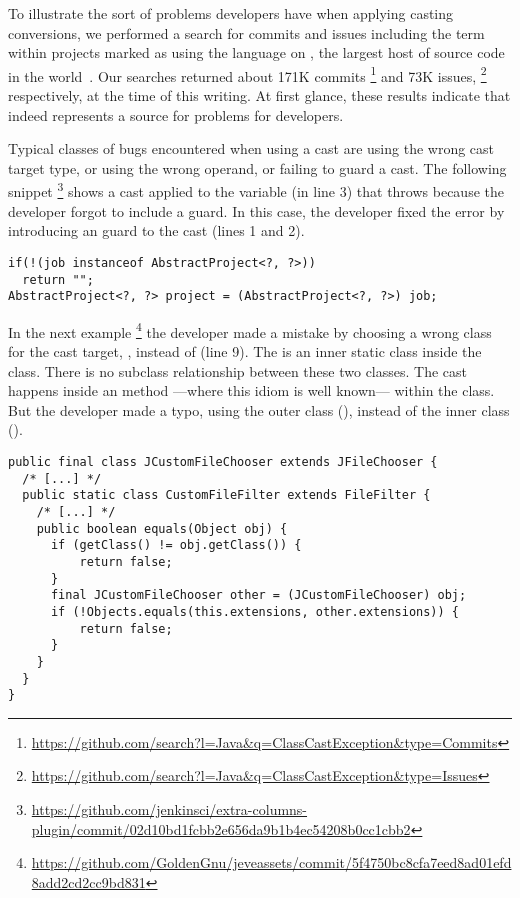 To illustrate the sort of problems developers have when applying casting conversions,
we performed a search for commits and issues including the term
 within projects marked as using the \java{} language
on \github{},
the largest host of source code in the world~\citep{gousiosLeanGHTorrentGitHub2014}.
Our searches returned about 171K commits%
\footnote{\url{https://github.com/search?l=Java&q=ClassCastException&type=Commits}}
and 73K issues,%
\footnote{\url{https://github.com/search?l=Java&q=ClassCastException&type=Issues}}
respectively, at the time of this writing.
At first glance, these results indicate that  indeed
represents a source for problems for developers.

Typical classes of bugs encountered when using a cast are using the wrong cast target type,
or using the wrong operand, or failing to guard a cast.
The following snippet%
\footnote{\url{https://github.com/jenkinsci/extra-columns-plugin/commit/02d10bd1fcbb2e656da9b1b4ec54208b0cc1cbb2}}
shows a cast applied to the variable  (in line 3) that throws  because the developer forgot to include a guard.
In this case, the developer fixed the error by introducing an  guard to the cast (lines 1 and 2).

\begin{verbatim}
if(!(job instanceof AbstractProject<?, ?>))
  return "";
AbstractProject<?, ?> project = (AbstractProject<?, ?>) job;
\end{verbatim}

In the next example%
\footnote{\url{https://github.com/GoldenGnu/jeveassets/commit/5f4750bc8cfa7eed8ad01efd8add2cd2cc9bd831}}
the developer made a mistake by choosing a wrong class for the cast target,
\ie,  instead of  (line 9).
The  is an inner static class inside the  class.
There is no subclass relationship between these two classes.
The cast happens inside an  method
---where this idiom is well known---
within the  class.
But the developer made a typo, using the outer class (), instead of the inner class ().

\begin{verbatim}
public final class JCustomFileChooser extends JFileChooser {
  /* [...] */
  public static class CustomFileFilter extends FileFilter {
    /* [...] */
    public boolean equals(Object obj) {
      if (getClass() != obj.getClass()) {
          return false;
      }
      final JCustomFileChooser other = (JCustomFileChooser) obj;
      if (!Objects.equals(this.extensions, other.extensions)) {
          return false;
      }
    }
  }
}
\end{verbatim} 

